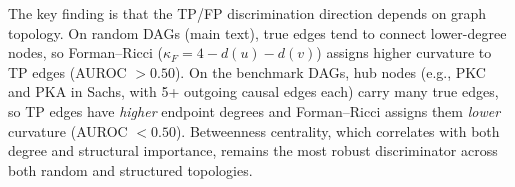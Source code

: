 \documentclass{article}
\begin{document}
The key finding is that the TP/FP discrimination direction depends on graph topology. On random DAGs (main text), true edges tend to connect lower-degree nodes, so Forman--Ricci ($\kappa_F = 4 - d(u) - d(v)$) assigns higher curvature to TP edges (AUROC $> 0.50$). On the benchmark DAGs, hub nodes (e.g., PKC and PKA in Sachs, with 5+ outgoing causal edges each) carry many true edges, so TP edges have \emph{higher} endpoint degrees and Forman--Ricci assigns them \emph{lower} curvature (AUROC $< 0.50$). Betweenness centrality, which correlates with both degree and structural importance, remains the most robust discriminator across both random and structured topologies.
\end{document}
